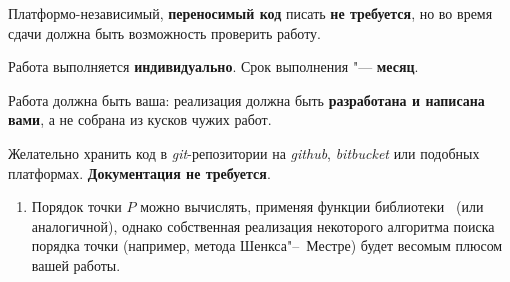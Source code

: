 \documentclass{ca-capstone}
\begin{document}
Платформо-независимый, \textbf{переносимый код} писать \textbf{не требуется}, но во время
сдачи должна быть возможность проверить работу.

\schedule
Работа выполняется \textbf{индивидуально}. Срок выполнения "--- \textbf{месяц}.

Работа должна быть ваша: реализация должна быть \textbf{разработана и написана вами}, а не
собрана из кусков чужих работ.

Желательно хранить код в \emph{git}-репозитории на \emph{github}, \emph{bitbucket} или
подобных платформах. \textbf{Документация не требуется}.

\remarks
\begin{enumerate}
  \item Порядок точки $P$ можно вычислять, применяя функции библиотеки~\cite{sagemath} (или
    аналогичной), однако собственная реализация некоторого алгоритма поиска порядка точки
    (например, метода Шенкса"--~Местре) будет весомым плюсом вашей работы.
\end{enumerate}

\end{document}
